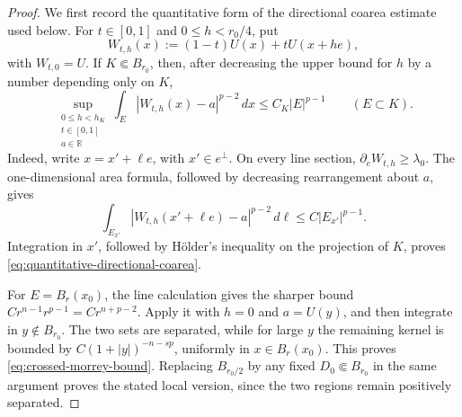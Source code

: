 \documentclass[10pt,a4paper]{amsart}
\newcommand{\R}{\mathbb R}
\newcommand{\dd}{\,d}
\begin{document}
\begin{proof}
We first record the quantitative form of the directional coarea
estimate used below.  For \(t\in[0,1]\) and \(0\le h<r_0/4\), put
\[
 W_{t,h}(x):=(1-t)U(x)+tU(x+he),
\]
with \(W_{t,0}=U\).  If \(K\Subset B_{r_0}\), then, after decreasing
the upper bound for \(h\) by a number depending only on \(K\),
\begin{equation}
 \sup_{\substack{0\le h<h_K\\t\in[0,1]\\a\in\R}}
 \int_E|W_{t,h}(x)-a|^{p-2}\dd x
 \le C_K|E|^{p-1}
 \qquad(E\subset K).
 \label{eq:quantitative-directional-coarea}
\end{equation}
Indeed, write \(x=x'+\ell e\), with \(x'\in e^\perp\).
On every line section, \(\partial_eW_{t,h}\ge\lambda_0\).  The
one-dimensional area formula, followed by decreasing rearrangement
about \(a\), gives
\[
 \int_{E_{x'}}|W_{t,h}(x'+\ell e)-a|^{p-2}\dd\ell
 \le C|E_{x'}|^{p-1}.
\]
Integration in \(x'\), followed by H\"older's inequality on the
projection of \(K\), proves
\eqref{eq:quantitative-directional-coarea}.

For \(E=B_r(x_0)\), the line calculation gives the sharper bound
\(Cr^{n-1}r^{p-1}=Cr^{n+p-2}\).  Apply it with \(h=0\) and
\(a=U(y)\), and then integrate in \(y\notin B_{r_0}\).  The two sets
are separated, while for large \(y\) the remaining kernel is bounded
by \(C(1+|y|)^{-n-sp}\), uniformly in \(x\in B_r(x_0)\).
This proves \eqref{eq:crossed-morrey-bound}.
Replacing \(B_{r_0/2}\) by any fixed \(D_0\Subset B_{r_0}\) in the
same argument proves the stated local version, since the two regions
remain positively separated.


\end{proof}
\end{document}
